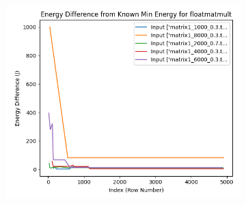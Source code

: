 \documentclass[times, 10pt,twocolumn]{article}
\begin{document}
\begin{figure}[ht]
\begin{subfigure}[b]{0.22\textwidth}
     \caption{}
     \label{fig:matmult_energy_diff}
   \end{subfigure}
   \hfill
   \begin{subfigure}[b]{0.22\textwidth}
      \includegraphics[width=\textwidth]{imgs/final_experiment_plots/model_analysis/measurement_data_analysis/matmult_compare_min.png}
     \caption{}
     \label{fig:matmult_comparemin}
   \end{subfigure}
   

\end{figure}
\end{document}
